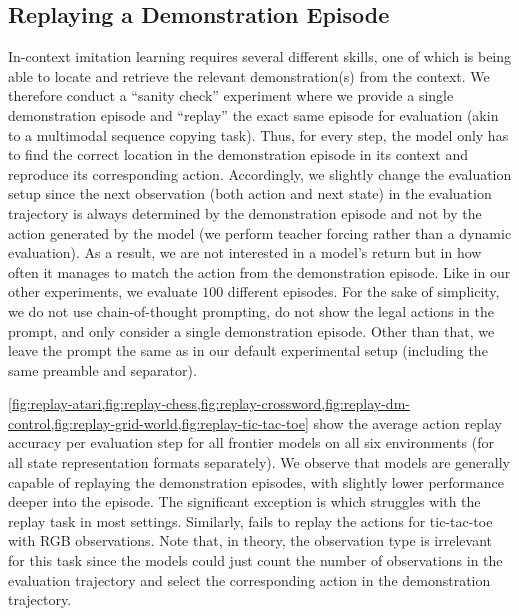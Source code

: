 \subsection{Replaying a Demonstration Episode}
\label{app:additional-results:replay}

In-context imitation learning requires several different skills, one of which is being able to locate and retrieve the relevant demonstration(s) from the context.
We therefore conduct a ``sanity check'' experiment where we provide a single demonstration episode and ``replay'' the exact same episode for evaluation (akin to a multimodal sequence copying task).
Thus, for every step, the model only has to find the correct location in the demonstration episode in its context and reproduce its corresponding action.
Accordingly, we slightly change the evaluation setup since the next observation (both action and next state) in the evaluation trajectory is always determined by the demonstration episode and not by the action generated by the model (\ie we perform teacher forcing rather than a dynamic evaluation).
As a result, we are not interested in a model's return but in how often it manages to match the action from the demonstration episode.
Like in our other experiments, we evaluate $100$ different episodes.
For the sake of simplicity, we do not use chain-of-thought prompting, do not show the legal actions in the prompt, and only consider a single demonstration episode.
Other than that, we leave the prompt the same as in our default experimental setup (\ie including the same preamble and separator).

\cref{fig:replay-atari,fig:replay-chess,fig:replay-crossword,fig:replay-dm-control,fig:replay-grid-world,fig:replay-tic-tac-toe} show the average action replay accuracy per evaluation step for all frontier models on all six environments (for all state representation formats separately).
We observe that models are generally capable of replaying the demonstration episodes, with slightly lower performance deeper into the episode.
The significant exception is \mini{} which struggles with the replay task in most settings.
Similarly, \flash{} fails to replay the actions for tic-tac-toe with RGB observations.
Note that, in theory, the observation type is irrelevant for this task since the models could just count the number of observations in the evaluation trajectory and select the corresponding action in the demonstration trajectory.

